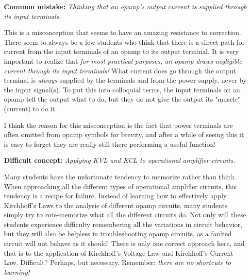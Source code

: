 \vskip 10pt

\noindent
{\bf Common mistake: } {\it Thinking that an opamp's output current is supplied through its input terminals.}

This is a misconception that seems to have an amazing resistance to correction.  There seem to always be a few students who think that there is a direct path for current from the input terminals of an opamp to its output terminal.  It is very important to realize that {\it for most practical purposes, an opamp draws negligible current through its input terminals!}  What current does go through the output terminal is {\it always} supplied by the  terminals and from the power supply, never by the input signal(s).  To put this into colloquial terms, the input terminals on an opamp tell the output what to do, but they do not give the output its "muscle" (current) to do it.

I think the reason for this misconception is the fact that power terminals are often omitted from opamp symbols for brevity, and after a while of seeing this it is easy to forget they are really still there performing a useful function!

\vskip 10pt

\noindent
{\bf Difficult concept: } {\it Applying KVL and KCL to operational amplifier circuits.}

Many students have the unfortunate tendency to memorize rather than think.  When approaching all the different types of operational amplifier circuits, this tendency is a recipe for failure.  Instead of learning how to effectively apply Kirchhoff's Laws to the analysis of different opamp circuits, many students simply try to rote-memorize what all the different circuits do.  Not only will these students experience difficulty remembering all the variations in circuit behavior, but they will also be helpless in troubleshooting opamp circuits, as a faulted circuit will not behave as it should!  There is only one correct approach here, and that is to  the application of Kirchhoff's Voltage Law and Kirchhoff's Current Law.  Difficult?  Perhaps, but necessary.  Remember: {\it there are no shortcuts to learning!}


